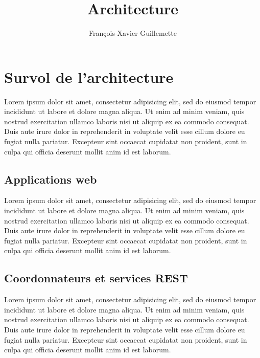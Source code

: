 \documentclass{article}
\begin{document}
\title{Architecture}
\author{François-Xavier Guillemette}
\maketitle

\begin{abstract}

\end{abstract}

\pagebreak
\tableofcontents
\pagebreak

\section{Survol de l'architecture} %
\label{sec:architecture}
Lorem ipsum dolor sit amet, consectetur adipisicing elit, sed do eiusmod tempor incididunt ut labore et dolore magna aliqua. Ut enim ad minim veniam, quis nostrud exercitation ullamco laboris nisi ut aliquip ex ea commodo consequat. Duis aute irure dolor in reprehenderit in voluptate velit esse cillum dolore eu fugiat nulla pariatur. Excepteur sint occaecat cupidatat non proident, sunt in culpa qui officia deserunt mollit anim id est laborum.

\subsection{Applications web} %
\label{sub:applications_web}
Lorem ipsum dolor sit amet, consectetur adipisicing elit, sed do eiusmod tempor incididunt ut labore et dolore magna aliqua. Ut enim ad minim veniam, quis nostrud exercitation ullamco laboris nisi ut aliquip ex ea commodo consequat. Duis aute irure dolor in reprehenderit in voluptate velit esse cillum dolore eu fugiat nulla pariatur. Excepteur sint occaecat cupidatat non proident, sunt in culpa qui officia deserunt mollit anim id est laborum.

\subsection{Coordonnateurs et services REST} %
\label{sub:coordonnateurs_et_services_rest}
Lorem ipsum dolor sit amet, consectetur adipisicing elit, sed do eiusmod tempor incididunt ut labore et dolore magna aliqua. Ut enim ad minim veniam, quis nostrud exercitation ullamco laboris nisi ut aliquip ex ea commodo consequat. Duis aute irure dolor in reprehenderit in voluptate velit esse cillum dolore eu fugiat nulla pariatur. Excepteur sint occaecat cupidatat non proident, sunt in culpa qui officia deserunt mollit anim id est laborum.
\end{document}
